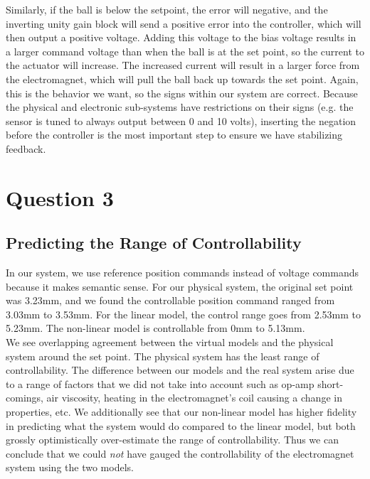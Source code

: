 \documentclass{article}
\theoremstyle{plain}
\theoremstyle{definition}
\theoremstyle{remark}
\begin{document}
Similarly, if the ball is below the setpoint, the error will negative, and the inverting unity gain block will send a positive error into the controller, which will then output a positive voltage. Adding this voltage to the bias voltage results in a larger command voltage than when the ball is at the set point, so the current to the actuator will increase. The increased current will result in a larger force from the electromagnet, which will pull the ball back up towards the set point. Again, this is the behavior we want, so the signs within our system are correct. Because the physical and electronic sub-systems have restrictions on their signs (e.g. the sensor is tuned to always output between 0 and 10 volts), inserting the negation before the controller is the most important step to ensure we have stabilizing feedback. 


\section*{Question 3}
\subsection*{Predicting the Range of Controllability}

In our system, we use reference position commands instead of voltage commands because it makes semantic sense. For our physical system, the original set point was 3.23mm, and we found the controllable position command ranged from 3.03mm to 3.53mm. For the linear model, the control range goes from 2.53mm to 5.23mm. The non-linear model is controllable from 0mm to 5.13mm.\\

We see overlapping agreement between the virtual models and the physical system around the set point. The physical system has the least range of controllability. The difference between our models and the real system arise due to a range of factors that we did not take into account such as op-amp short-comings, air viscosity, heating in the electromagnet's coil causing a change in properties, etc. We additionally see that our non-linear model has higher fidelity in predicting what the system would do compared to the linear model, but both grossly optimistically over-estimate the range of controllability. Thus we can conclude that we could \emph{not} have gauged the controllability of the electromagnet system using the two models.\\
\end{document}
